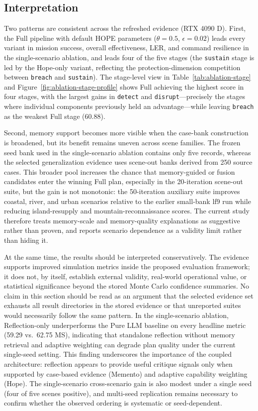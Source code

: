 \subsection{Interpretation}

Two patterns are consistent across the refreshed evidence (RTX 4090 D). First, the Full pipeline with default HOPE parameters ($\theta=0.5$, $\epsilon=0.02$) leads every variant in mission success, overall effectiveness, LER, and command resilience in the single-scenario ablation, and leads four of the five stages (the \texttt{sustain} stage is led by the Hope-only variant, reflecting the protection-dimension competition between \texttt{breach} and \texttt{sustain}). The stage-level view in Table~\ref{tab:ablation-stage} and Figure~\ref{fig:ablation-stage-profile} shows Full achieving the highest score in four stages, with the largest gains in \texttt{detect} and \texttt{disrupt}---precisely the stages where individual components previously held an advantage---while leaving \texttt{breach} as the weakest Full stage (60.88).

Second, memory support becomes more visible when the case-bank construction is broadened, but its benefit remains uneven across scene families. The frozen seed bank used in the single-scenario ablation contains only five records, whereas the selected generalization evidence uses scene-out banks derived from 250 source cases. This broader pool increases the chance that memory-guided or fusion candidates enter the winning Full plan, especially in the 20-iteration scene-out suite, but the gain is not monotonic: the 50-iteration auxiliary suite improves coastal, river, and urban scenarios relative to the earlier small-bank lf9 run while reducing island-resupply and mountain-reconnaissance scores. The current study therefore treats memory-scale and memory-quality explanations as suggestive rather than proven, and reports scenario dependence as a validity limit rather than hiding it.

At the same time, the results should be interpreted conservatively. The evidence supports improved simulation metrics inside the proposed evaluation framework; it does not, by itself, establish external validity, real-world operational value, or statistical significance beyond the stored Monte Carlo confidence summaries. No claim in this section should be read as an argument that the selected evidence set exhausts all result directories in the stored evidence or that unreported suites would necessarily follow the same pattern. In the single-scenario ablation, Reflection-only underperforms the Pure LLM baseline on every headline metric (59.29 vs.\ 62.75 MS), indicating that standalone reflection without memory retrieval and adaptive weighting can degrade plan quality under the current single-seed setting. This finding underscores the importance of the coupled architecture: reflection appears to provide useful critique signals only when supported by case-based evidence (Memento) and adaptive capability weighting (Hope). The single-scenario cross-scenario gain is also modest under a single seed (four of five scenes positive), and multi-seed replication remains necessary to confirm whether the observed ordering is systematic or seed-dependent.

